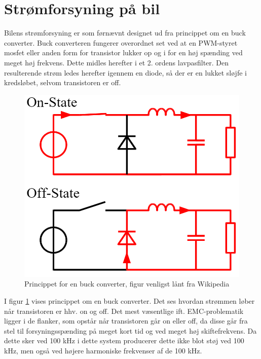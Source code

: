 \section{Strømforsyning på bil}

Bilens strømforsyning er som førnævnt designet ud fra princippet om en buck converter. Buck converteren fungerer overordnet set ved at en PWM-styret mosfet eller anden form for transistor lukker op og i for en høj spænding ved meget høj frekvens. 
Dette midles herefter i et 2. ordens lavpasfilter.
Den resulterende strøm ledes herefter igennem en diode, så der er en lukket sløjfe i kredsløbet, selvom transistoren er off.

\begin{figure}[h]
\centering
\includegraphics[width=\textwidth * 1/2]{../fig/billeder/buck_circuit_diagram}
\caption{Princippet for en buck converter, figur venligst lånt fra Wikipedia}
\label{fig:buck_conv}
\end{figure}

I figur \ref{fig:buck_conv} vises princippet om en buck converter. 
Det ses hvordan strømmen løber når transistoren er hhv. on og off.
Det mest væsentlige ift. EMC-problematik ligger i de flanker, som opstår når transistoren går on eller off, da disse går fra stel til forsyningsspænding på meget kort tid og ved meget høj skiftefrekvens.
Da dette sker ved 100 kHz i dette system producerer dette ikke blot støj ved 100 kHz, men også ved højere harmoniske frekvenser af de 100 kHz.
\clearpage


